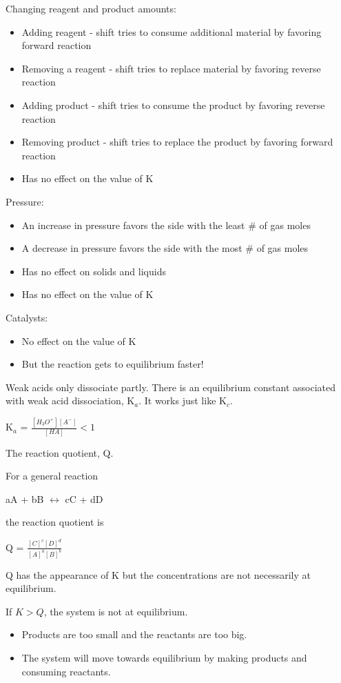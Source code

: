 \documentclass[../hchem.tex]{subfiles}
\begin{document}
Changing reagent and product amounts:
\begin{itemize}
    \item Adding reagent - shift tries to consume additional material by favoring forward reaction 
    \item Removing a reagent - shift tries to replace material by favoring reverse reaction 
    \item Adding product - shift tries to consume the product by favoring reverse reaction 
    \item Removing product - shift tries to replace the product by favoring forward reaction 
    \item Has no effect on the value of K 
\end{itemize}

Pressure:
\begin{itemize}
    \item An increase in pressure favors the side with the least \# of gas moles 
    \item A decrease in pressure favors the side with the most \# of gas moles 
    \item Has no effect on solids and liquids 
    \item Has no effect on the value of K
\end{itemize}

Catalysts:
\begin{itemize}
    \item No effect on the value of K 
    \item But the reaction gets to equilibrium faster!
\end{itemize}

Weak acids only dissociate partly. There is an equilibrium constant associated with weak acid dissociation, K$_a$. It works just like K$_c$.
\begin{center}
    K$_a$ = $\frac{[H_3O^+][A^-]}{[HA]}<1$
\end{center}

The reaction quotient, Q.

For a general reaction 
\begin{center}
    aA + bB $\leftrightarrow$ cC + dD 
\end{center}
the reaction quotient is 
\begin{center}
    Q = $\frac{[C]^c[D]^d}{[A]^a[B]^b}$
\end{center}
Q has the appearance of K but the concentrations are not necessarily at equilibrium.

If $K>Q$, the system is not at equilibrium.
\begin{itemize}
    \item Products are too small and the reactants are too big.
    \item The system will move towards equilibrium by making products and consuming reactants.
\end{itemize}
\end{document}
